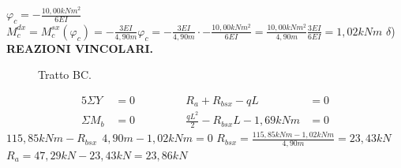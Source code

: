 \documentclass[a4paper,12pt, oneside]{book}
\begin{document}
    \leavevmode\newline
   	$\varphi_{c}=-\frac{10,00kNm^{2}}{6EI}$ 
    \leavevmode\newline
    \leavevmode\newline
    \leavevmode\newline
    $M_{c}^{dx}=M_{c}^{sx}(\varphi_{c})=-\frac{3EI}{4,90m}\varphi_{c}=-\frac{3EI}{4,90m}\cdot-\frac{10,00kNm^{2}}{6EI}=\frac{10,00kNm^{2}}{4,90m}\frac{3EI}{6EI}=1,02kNm$
    \leavevmode\newline
    \leavevmode\newline
    \leavevmode\newline
    \leavevmode\newline
    $\delta$) \textbf{REAZIONI VINCOLARI.}
    \leavevmode\newline
    \leavevmode\newline
    \begin{figure}[H]
    	\centering
    	\hspace*{-1.6cm}
    	\caption{Tratto BC.}
    	\label{fig:reazionevincolareBC}
    \end{figure}
    
    \begin{alignat*}{5}
    	\Sigma Y\phantom{_b}   & {}=0{} & \phantom{123456} & R_a+R_{bsx}-qL        & {}=0{}\\
    	\Sigma M_b & {}=0{} & \phantom{123456} & \frac{qL^{2}}{2}-R_{bsx}L-1,69kNm & {}=0{} 
    \end{alignat*}
    \leavevmode\newline
    \leavevmode\newline
    $115,85kNm-R_{bsx}\phantom{,}4,90m-1,02kNm=0$
    \leavevmode\newline
    \leavevmode\newline
    $R_{bsx}=\frac{115,85kNm-1,02kNm}{4,90m}=23,43kN$
    \leavevmode\newline
    \leavevmode\newline
    $R_a=47,29kN-23,43kN=23,86kN$
    
\end{document}
